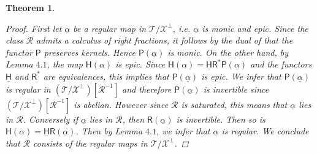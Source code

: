 \documentclass[oneside, a4paper,reqno]{amsart}
\numberwithin{equation}{section}
\newtheorem{thm}{Theorem}[section]
\theoremstyle{definition}
\begin{document}
\begin{thm}
\begin{proof}
First let $\underline{\alpha}$ be a regular map in ${\mathcal T}/{\mathcal X}^{\bot}$, i.e. $\underline{\alpha}$ is monic and epic. Since the class ${\mathcal R}$ admits a calculus of right fractions, it follows by the dual of \cite[Proposition I.3.1, page 16]{GZ} that the functor $\mathsf{P}$ preserves kernels. Hence $\mathsf{P}(\underline{\alpha})$ is monic. On the other hand, by Lemma $4.1$, the map $\mathsf{H}(\alpha)$ is epic. Since $\mathsf{H}(\alpha) = \underline{\mathsf{H}} \mathsf{R}^{*}  \mathsf{P}(\underline{\alpha})$ and the functors $\underline{\mathsf{H}}$ and $\mathsf{R}^{*}$ are equivalences, this implies that $\mathsf{P}(\underline{\alpha})$ is epic. We infer that  $\mathsf{P}(\underline{\alpha})$ is regular in $({\mathcal T}/{\mathcal X}^{\bot})[\mathcal R^{-1}]$ and therefore $\mathsf{P}(\underline{\alpha})$ is invertible since  $({\mathcal T}/{\mathcal X}^{\bot})[\mathcal R^{-1}]$ is abelian. However since $\mathcal R$ is saturated, this means that $\underline{\alpha}$ lies in $\mathcal R$. Conversely if $\underline{\alpha}$ lies in $\mathcal R$, then $\mathsf{R}(\underline{\alpha})$ is invertible. Then so is $\mathsf{H}(\alpha) = \underline{\mathsf{H}}\mathsf{R}(\underline{\alpha})$. Then by Lemma $4.1$, we infer that $\underline{\alpha}$ is regular. We conclude that $\mathcal R$ consists of the regular maps in ${\mathcal T}/{\mathcal X}^{\bot}$. 


\end{proof}
\end{thm}
\end{document}
